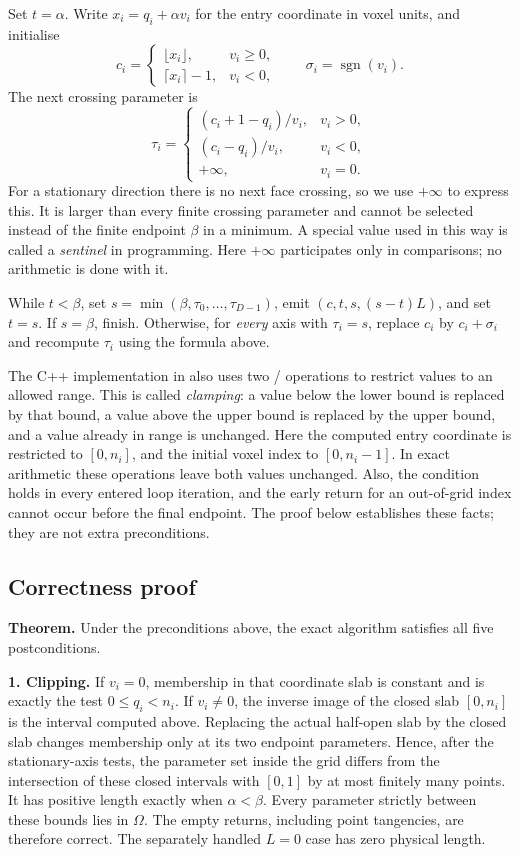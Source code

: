 Set $t=\alpha$. Write $x_i=q_i+\alpha v_i$ for the entry coordinate in
voxel units, and initialise
\[
 c_i=\begin{cases}
       \lfloor x_i\rfloor,&v_i\geq0,\\
       \lceil x_i\rceil-1,&v_i<0,
     \end{cases}
 \qquad \sigma_i=\operatorname{sgn}(v_i).
\]
The next crossing parameter is
\[
 \tau_i=\begin{cases}
       (c_i+1-q_i)/v_i,&v_i>0,\\
       (c_i-q_i)/v_i,&v_i<0,\\
       +\infty,&v_i=0.
     \end{cases}
\]
For a stationary direction there is no next face crossing, so we use
$+\infty$ to express this. It is larger than every finite crossing parameter
and cannot be selected instead of the finite endpoint $\beta$ in a minimum.
A special value used in this way is called a \emph{sentinel} in programming.
Here $+\infty$ participates only in comparisons; no arithmetic is done with it.

While $t<\beta$, set $s=\min(\beta,\tau_0,\ldots,\tau_{D-1})$,
emit $(c,t,s,(s-t)L)$, and set $t=s$. If $s=\beta$, finish.
Otherwise, for \emph{every} axis with $\tau_i=s$, replace $c_i$ by
$c_i+\sigma_i$ and recompute $\tau_i$ using the formula above.

The C++ implementation in  also uses two
/ operations to restrict values to an allowed range.
This is called \emph{clamping}: a value below the lower bound is replaced
by that bound, a value above the upper bound is replaced by the upper bound,
and a value already in range is unchanged. Here the computed entry coordinate
is restricted to $[0,n_i]$, and the initial voxel index to $[0,n_i-1]$.
In exact arithmetic these operations leave both values unchanged.
Also, the condition  holds in every entered loop iteration,
and the early return for an out-of-grid index cannot occur before the final
endpoint. The proof below establishes these facts; they are not extra
preconditions.

\subsection{Correctness proof}
\label{app:exact-proof}
\textbf{Theorem.} Under the preconditions above, the exact algorithm
satisfies all five postconditions.

\textbf{1. Clipping.}
If $v_i=0$, membership in that coordinate slab is constant and is exactly
the test $0\leq q_i<n_i$. If $v_i\ne0$, the inverse image of the closed
slab $[0,n_i]$ is the interval computed above. Replacing the actual half-open
slab by the closed slab changes membership only at its two endpoint
parameters. Hence, after the stationary-axis tests, the parameter set inside
the grid differs from the intersection of these closed intervals with
$[0,1]$ by at most finitely many points. It has positive length exactly when
$\alpha<\beta$. Every parameter strictly between these bounds lies in
$\Omega$. The empty returns, including point tangencies, are therefore
correct. The separately handled $L=0$ case has zero physical length.

